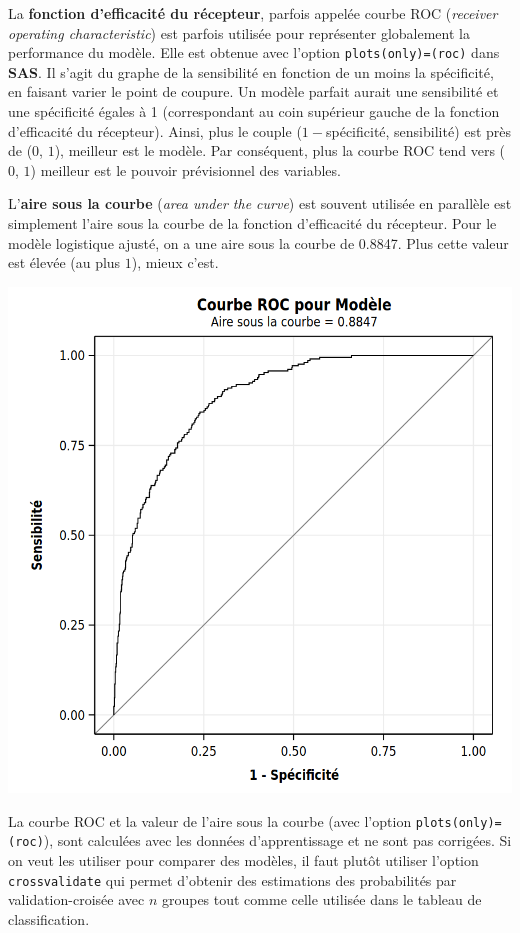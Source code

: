 \documentclass[
  11pt,
  letterpaper,
]{book}
\theoremstyle{definition}
\theoremstyle{definition}
\theoremstyle{definition}
\theoremstyle{definition}
\theoremstyle{remark}
\begin{document}
La \textbf{fonction d'efficacité du récepteur}, parfois appelée courbe ROC (\emph{receiver operating characteristic}) est parfois utilisée pour représenter globalement la performance du modèle. Elle est obtenue avec l'option \texttt{plots(only)=(roc)} dans \textbf{SAS}. Il s'agit du graphe de la sensibilité en fonction de un moins la spécificité, en faisant varier le point de coupure. Un modèle parfait aurait une sensibilité et une spécificité égales à 1 (correspondant au coin supérieur gauche de la fonction d'efficacité du récepteur). Ainsi, plus le couple (\(1-\)spécificité, sensibilité) est près de (\(0\), \(1\)), meilleur est le modèle. Par conséquent, plus la courbe ROC tend vers (\(0\), \(1\)) meilleur est le pouvoir prévisionnel des variables.

L'\textbf{aire sous la courbe} (\emph{area under the curve}) est souvent utilisée en parallèle
est simplement l'aire sous la courbe de la fonction d'efficacité du récepteur. Pour le modèle logistique ajusté, on a une aire sous la courbe de 0.8847. Plus cette valeur est élevée (au plus \(1\)), mieux c'est.

\begin{center}\includegraphics[width=0.8\linewidth]{figures/03-logistic-e11} \end{center}

La courbe ROC et la valeur de l'aire sous la courbe (avec l'option \texttt{plots(only)=(roc)}), sont calculées avec les données d'apprentissage et ne sont pas corrigées. Si on veut les utiliser pour comparer des modèles, il faut plutôt utiliser l'option \texttt{crossvalidate} qui permet d'obtenir des estimations des probabilités par validation-croisée avec \(n\) groupes tout comme celle utilisée dans le tableau de classification.
\end{document}
